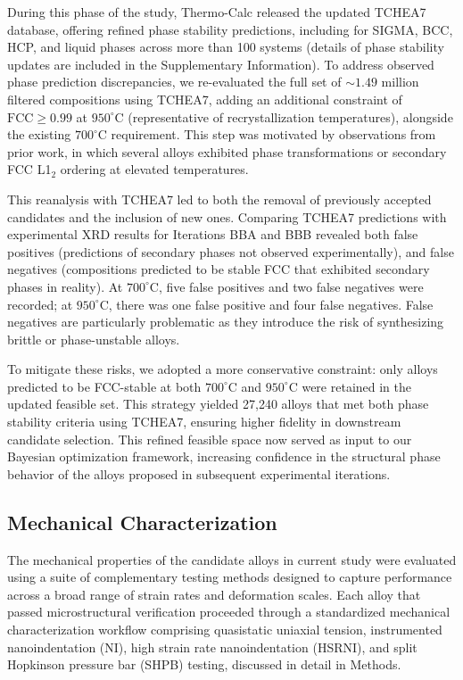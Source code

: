 During this phase of the study, Thermo-Calc released the updated TCHEA7 database, offering refined phase stability predictions, including for SIGMA, BCC, HCP, and liquid phases across more than 100 systems (details of phase stability updates are included in the Supplementary Information). To address observed phase prediction discrepancies, we re-evaluated the full set of \(\sim 1.49\) million filtered compositions using TCHEA7, adding an additional constraint of \(\text{FCC} \geq 0.99\) at \(950^\circ\text{C}\) (representative of recrystallization temperatures), alongside the existing \(700^\circ\text{C}\) requirement. This step was motivated by observations from prior work, in which several alloys exhibited phase transformations or secondary FCC L1\(_2\) ordering at elevated temperatures.

This reanalysis with TCHEA7 led to both the removal of previously accepted candidates and the inclusion of new ones. Comparing TCHEA7 predictions with experimental XRD results for Iterations BBA and BBB revealed both false positives (predictions of secondary phases not observed experimentally), and false negatives (compositions predicted to be stable FCC that exhibited secondary phases in reality). At \(700^\circ\text{C}\), five false positives and two false negatives were recorded; at \(950^\circ\text{C}\), there was one false positive and four false negatives. False negatives are particularly problematic as they introduce the risk of synthesizing brittle or phase-unstable alloys.

To mitigate these risks, we adopted a more conservative constraint: only alloys predicted to be FCC-stable at both \(700^\circ\text{C}\) and \(950^\circ\text{C}\) were retained in the updated feasible set. This strategy yielded 27,240 alloys that met both phase stability criteria using TCHEA7, ensuring higher fidelity in downstream candidate selection. This refined feasible space now served as input to our Bayesian optimization framework, increasing confidence in the structural phase behavior of the alloys proposed in subsequent experimental iterations.


\subsection{Mechanical Characterization}
The mechanical properties of the candidate alloys in current study were evaluated using a suite of complementary testing methods designed to capture performance across a broad range of strain rates and deformation scales. Each alloy that passed microstructural verification proceeded through a standardized mechanical characterization workflow comprising quasistatic uniaxial tension, instrumented nanoindentation (NI), high strain rate nanoindentation (HSRNI), and split Hopkinson pressure bar (SHPB) testing, discussed in detail in Methods. %


